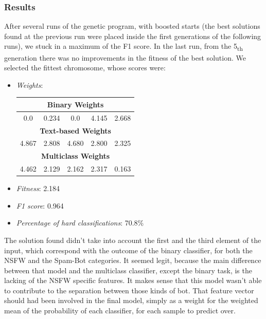 \subsubsection{Results}
After several runs of the genetic program, with boosted starts (the best solutions found at the previous run were placed inside the first generations of the following runs), we stuck in a maximum of the F1 score.
In the last run, from the 5\textsubscript{th} generation there was no improvements in the fitness of the best solution. We selected the fittest chromosome, whose scores were:
\begin{itemize}
	\item[\PencilRight] \textit{Weights}:

	\begin{center}
		\begin{tabular}{@{}c|c|c|c|c@{}}
			\hline\hline
			\multicolumn{5}{c}{\textbf{Binary Weights}}\\
			\hline
			\multicolumn{1}{c|}{0.0}&
			\multicolumn{1}{c|}{0.234}&
			\multicolumn{1}{c|}{0.0}&
			\multicolumn{1}{c|}{4.145}&
			\multicolumn{1}{c}{2.668}\\
			\hline
			\multicolumn{5}{c}{\textbf{Text-based Weights}}\\
			\hline
			\multicolumn{1}{c|}{4.867}&
			\multicolumn{1}{c|}{2.808}&
			\multicolumn{1}{c|}{4.680}&
			\multicolumn{1}{c|}{2.800}&
			\multicolumn{1}{c}{2.325}\\
			\hline
			\multicolumn{5}{c}{\textbf{Multiclass Weights}}\\
			\hline
			\multicolumn{1}{c|}{4.462}&
			\multicolumn{1}{c|}{2.129}&
			\multicolumn{1}{c|}{2.162}&
			\multicolumn{1}{c|}{2.317}&
			\multicolumn{1}{c}{0.163}\\
			\hline\hline
		\end{tabular}
	\end{center}
	\item[\PencilRight] \textit{Fitness}: 2.184
	\item[\PencilRight] \textit{F1 score}: 0.964
	\item[\PencilRight] \textit{Percentage of hard classifications}: 70.8\%
\end{itemize}
The solution found didn't take into account the first and the third element of the input, which correspond with the outcome of the binary classifier, for both the NSFW and the Spam-Bot categories. It seemed legit, because the main difference between that model and the multiclass classifier, except the binary task, is the lacking of the NSFW specific features. It makes sense that this model wasn't able to contribute to the separation between those kinds of bot.
That feature vector should had been involved in the final model, simply as a weight for the weighted mean of the probability of each classifier, for each sample to predict over.

